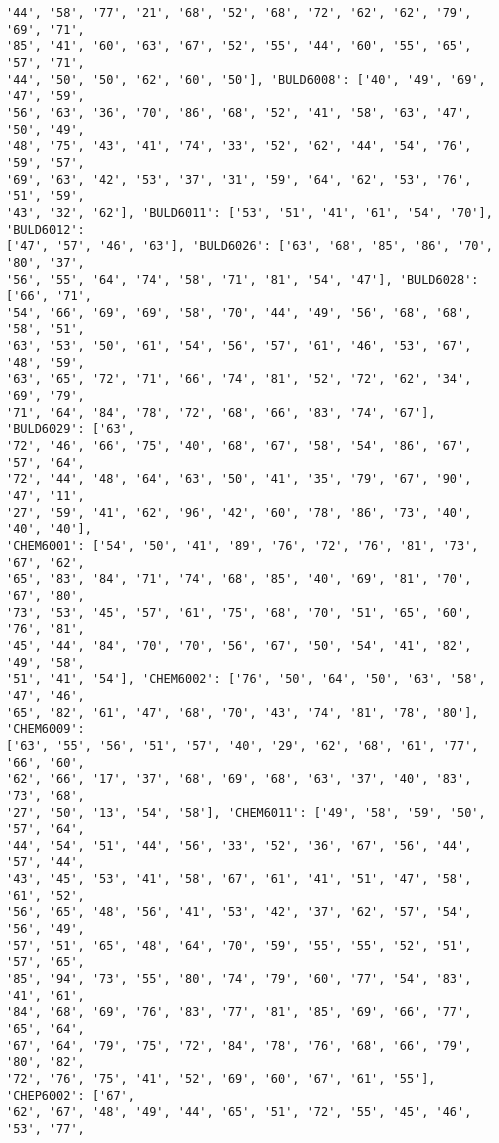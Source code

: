 \documentclass[11pt]{article}
\begin{document}
\begin{Verbatim}[commandchars=\\\{\}]
'44', '58', '77', '21', '68', '52', '68', '72', '62', '62', '79', '69', '71',
'85', '41', '60', '63', '67', '52', '55', '44', '60', '55', '65', '57', '71',
'44', '50', '50', '62', '60', '50'], 'BULD6008': ['40', '49', '69', '47', '59',
'56', '63', '36', '70', '86', '68', '52', '41', '58', '63', '47', '50', '49',
'48', '75', '43', '41', '74', '33', '52', '62', '44', '54', '76', '59', '57',
'69', '63', '42', '53', '37', '31', '59', '64', '62', '53', '76', '51', '59',
'43', '32', '62'], 'BULD6011': ['53', '51', '41', '61', '54', '70'], 'BULD6012':
['47', '57', '46', '63'], 'BULD6026': ['63', '68', '85', '86', '70', '80', '37',
'56', '55', '64', '74', '58', '71', '81', '54', '47'], 'BULD6028': ['66', '71',
'54', '66', '69', '69', '58', '70', '44', '49', '56', '68', '68', '58', '51',
'63', '53', '50', '61', '54', '56', '57', '61', '46', '53', '67', '48', '59',
'63', '65', '72', '71', '66', '74', '81', '52', '72', '62', '34', '69', '79',
'71', '64', '84', '78', '72', '68', '66', '83', '74', '67'], 'BULD6029': ['63',
'72', '46', '66', '75', '40', '68', '67', '58', '54', '86', '67', '57', '64',
'72', '44', '48', '64', '63', '50', '41', '35', '79', '67', '90', '47', '11',
'27', '59', '41', '62', '96', '42', '60', '78', '86', '73', '40', '40', '40'],
'CHEM6001': ['54', '50', '41', '89', '76', '72', '76', '81', '73', '67', '62',
'65', '83', '84', '71', '74', '68', '85', '40', '69', '81', '70', '67', '80',
'73', '53', '45', '57', '61', '75', '68', '70', '51', '65', '60', '76', '81',
'45', '44', '84', '70', '70', '56', '67', '50', '54', '41', '82', '49', '58',
'51', '41', '54'], 'CHEM6002': ['76', '50', '64', '50', '63', '58', '47', '46',
'65', '82', '61', '47', '68', '70', '43', '74', '81', '78', '80'], 'CHEM6009':
['63', '55', '56', '51', '57', '40', '29', '62', '68', '61', '77', '66', '60',
'62', '66', '17', '37', '68', '69', '68', '63', '37', '40', '83', '73', '68',
'27', '50', '13', '54', '58'], 'CHEM6011': ['49', '58', '59', '50', '57', '64',
'44', '54', '51', '44', '56', '33', '52', '36', '67', '56', '44', '57', '44',
'43', '45', '53', '41', '58', '67', '61', '41', '51', '47', '58', '61', '52',
'56', '65', '48', '56', '41', '53', '42', '37', '62', '57', '54', '56', '49',
'57', '51', '65', '48', '64', '70', '59', '55', '55', '52', '51', '57', '65',
'85', '94', '73', '55', '80', '74', '79', '60', '77', '54', '83', '41', '61',
'84', '68', '69', '76', '83', '77', '81', '85', '69', '66', '77', '65', '64',
'67', '64', '79', '75', '72', '84', '78', '76', '68', '66', '79', '80', '82',
'72', '76', '75', '41', '52', '69', '60', '67', '61', '55'], 'CHEP6002': ['67',
'62', '67', '48', '49', '44', '65', '51', '72', '55', '45', '46', '53', '77',

\end{Verbatim}
\end{document}
